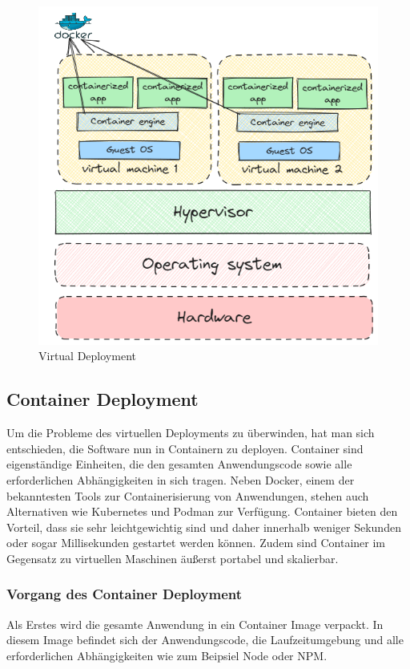 \begin{figure}[h!]
    \centering
    \includegraphics[width=0.7\linewidth]{pics/virtual-deployment.png}
    \caption{Virtual Deployment}
    \label{fig:enter-label}
\end{figure}

\cite{Virtuelles_Deployment}
\subsection{Container Deployment}
Um die Probleme des virtuellen Deployments zu überwinden, hat man sich entschieden, die Software nun in Containern zu deployen. Container sind eigenständige Einheiten, die den gesamten Anwendungscode sowie alle erforderlichen Abhängigkeiten in sich tragen. Neben Docker, einem der bekanntesten Tools zur Containerisierung von Anwendungen, stehen auch Alternativen wie Kubernetes und Podman zur Verfügung. Container bieten den Vorteil, dass sie sehr leichtgewichtig sind und daher innerhalb weniger Sekunden oder sogar Millisekunden gestartet werden können. Zudem sind Container im Gegensatz zu virtuellen Maschinen äußerst portabel und skalierbar.



\subsubsection{Vorgang des Container Deployment}

Als Erstes wird die gesamte Anwendung in ein Container Image verpackt. In diesem Image befindet sich der Anwendungscode, die Laufzeitumgebung und alle erforderlichen Abhängigkeiten wie zum Beipsiel Node oder NPM.


